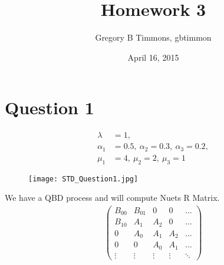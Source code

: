 \documentclass[fleqn]{article}
\newcommand{\mm}[1]{\begin{pmatrix}#1\end{pmatrix}}
\newcommand{\nn}[1]{ \begin{align*}#1\end{align*}}
\begin{document}

\title{Homework 3}
\date{April 16, 2015}
\author{Gregory B Timmons, gbtimmon}
\maketitle

\section*{Question 1}	
\nn{ 
	\lambda 	&= 1,\\
	\alpha_1 	&= 0.5,\ \alpha_2 = 0.3,\ \alpha_3 = 0.2,\\
	\mu_1 		&= 4,\ \mu_2 = 2,\ \mu_3 = 1 
}

\begin{figure}[ht!]
\texttt{[image: STD\_Question1.jpg]}
\end{figure}
We have a QBD process and will compute Nuets R Matrix. 
\nn{\mm{
  	B_{00} & B_{01} & 0 & 0 & \ldots\\
  	B_{10} & A_1 & A_2 & 0  & \ldots\\ 
  	0      & A_0 & A_1 & A_2 & \ldots\\ 
  	0      & 0   & A_0 & A_1 & \ldots\\
 	\vdots&\vdots&\vdots&\vdots&\ddots 
 }}
 
\end{document}
